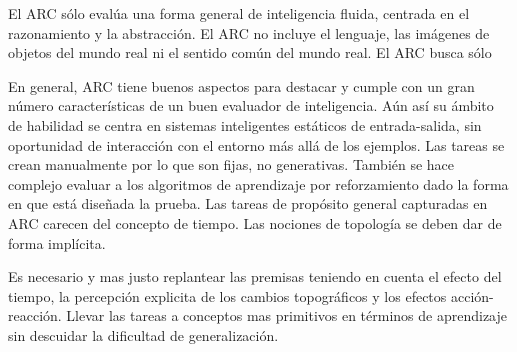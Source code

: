El ARC sólo evalúa una forma general de inteligencia fluida, centrada en el razonamiento y la abstracción. El ARC no incluye el lenguaje, las imágenes de objetos del mundo real ni el sentido común del mundo real. El ARC busca sólo

En general, ARC tiene buenos aspectos para destacar y cumple con un gran número características de un buen evaluador de inteligencia. Aún así su ámbito de habilidad se centra en sistemas inteligentes estáticos de entrada-salida, sin oportunidad de interacción con el entorno más allá de los ejemplos. Las tareas se crean manualmente por lo que son fijas, no generativas. También se hace complejo evaluar a los algoritmos de aprendizaje por reforzamiento dado la forma en que está diseñada la prueba. Las tareas de propósito general capturadas en ARC carecen del concepto de tiempo. Las nociones de topología se deben dar de forma implícita. 

Es necesario y mas justo replantear las premisas teniendo en cuenta el efecto del tiempo, la percepción explicita de los cambios topográficos y los efectos acción-reacción. Llevar las tareas a conceptos mas primitivos en términos de aprendizaje sin descuidar la dificultad de generalización.


